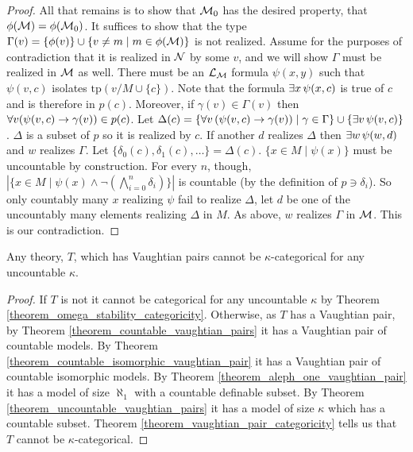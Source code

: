 \begin{proof}
All that remains is to show that \(\mathcal{M}_0\) has the desired property, that \(\phi(\mathcal{M}) = \phi(\mathcal{M}_0)\).   
It suffices to show that the type \(\Gamma(v) = \{\phi(v)\} \cup \{v \neq m \mid m \in \phi(\mathcal{M})\}\) is not realized. 
Assume for the purposes of contradiction that it is realized in \(\mathcal{N}\) by some \(v\), and we will show \(\Gamma\) must be realized in \(\mathcal{M}\) as well. 
There must be an \(\mathcal{L}_{\mathcal{M}}\) formula \(\psi(x, y)\) such that \(\psi(v, c)\) isolates \(\text{tp}(v/M \cup \{c\})\). %
Note that the formula \(\exists x \, \psi(x, c)\) is true of \(c\) and is therefore in \(p(c)\). 
Moreover, if \(\gamma(v) \in \Gamma(v)\) then \(\forall v (\psi(v, c) \to \gamma(v)) \in p(c)\). 
Let \(\Delta(c) = \{\forall v \, (\psi(v, c) \to \gamma(v)) \mid \gamma \in \Gamma\} \cup \{\exists v \, \psi(v, c)\}\).
\(\Delta\) is a subset of \(p\) so it is realized by \(c\). 
If another \(d\) realizes \(\Delta\) then \(\exists w \, \psi(w, d)\) and \(w\) realizes \(\Gamma\).
Let \(\{\delta_0(c), \delta_1(c), \ldots\} = \Delta(c)\). 
\(\{x \in M \mid \psi(x)\}\) must be uncountable by construction. 
For every \(n\), though, \(|\{x \in M \mid \psi(x) \land \neg (\bigwedge\limits_{i=0}^n\delta_i)\}|\) is countable (by the definition of \(p \ni \delta_i\)).
So only countably many \(x\) realizing \(\psi\) fail to realize \(\Delta\), let \(d\) be one of the uncountably many elements realizing \(\Delta\) in \(M\).
As above, \(w\) realizes \(\Gamma\) in \(\mathcal{M}\). This is our contradiction.  
\end{proof}

\begin{theorem}\label{theorem_vaughtian_pairs_categoricity}
Any theory, \(T\), which has Vaughtian pairs cannot be \(\kappa\)-categorical for any uncountable \(\kappa\).
\end{theorem}

\begin{proof}
If \(T\) is not \omst it cannot be categorical for any uncountable \(\kappa\) by Theorem \ref{theorem_omega_stability_categoricity}.
Otherwise, as \(T\) has a Vaughtian pair, by Theorem \ref{theorem_countable_vaughtian_pairs} it has a Vaughtian pair of countable models. 
By Theorem \ref{theorem_countable_isomorphic_vaughtian_pair} it has a Vaughtian pair of countable isomorphic models.
By Theorem \ref{theorem_aleph_one_vaughtian_pair} it has a model of size \(\aleph_1\) with a countable definable subset. 
By Theorem \ref{theorem_uncountable_vaughtian_pairs} it has a model of size \(\kappa\) which has a countable subset.  
Theorem \ref{theorem_vaughtian_pair_categoricity} tells us that \(T\) cannot be \(\kappa\)-categorical. 
\end{proof}
